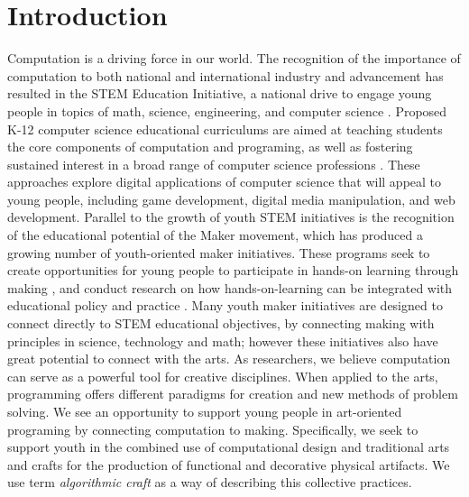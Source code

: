 \documentclass{sigchi}
\begin{document}


\section{Introduction}
Computation is a driving force in our world. The recognition of the importance of computation to both national and international industry and advancement has resulted in the STEM Education Initiative, a national drive to engage young people in topics of math, science, engineering, and computer science \cite{stemReport}. Proposed K-12 computer science educational curriculums are aimed at teaching students the core components of computation and programing, as well as fostering sustained interest in a broad range of computer science professions \cite{k12ModelCur}. These approaches explore digital applications of computer science that will appeal to young people, including game development, digital media manipulation, and web development. Parallel to the growth of youth STEM initiatives is the recognition of the educational potential of the Maker movement, which has produced a growing number of youth-oriented maker initiatives. These programs seek to create opportunities for young people to participate in hands-on learning through making \cite{makerinitiatives}, and conduct research on how hands-on-learning can be integrated with educational policy and practice \cite{maketolearn}. Many youth maker initiatives are designed to connect directly to STEM educational objectives, by connecting making with principles in science, technology and math; however these initiatives also have great potential to connect with the arts. As researchers, we believe computation can serve as a powerful tool for creative disciplines. When applied to the arts, programming offers different paradigms for creation and new methods of problem solving. We see an opportunity to support young people in art-oriented programing by connecting computation to making. Specifically, we seek to support youth in the combined use of computational design and traditional arts and crafts for the production of functional and decorative physical artifacts. We use term \textit{algorithmic craft} as a way of describing this collective practices. %
\end{document}
